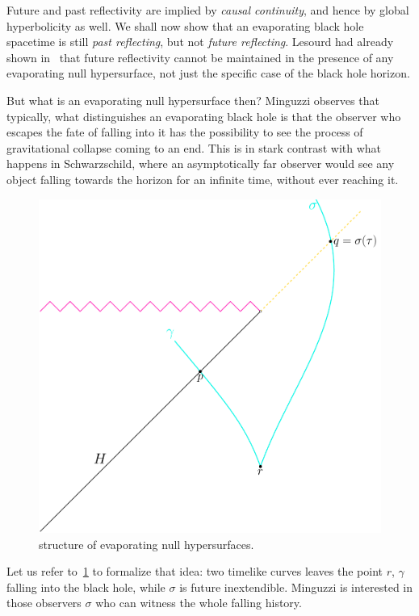 	Future and past reflectivity are implied by \emph{causal continuity}, and hence by global hyperbolicity as well. We shall now show that an evaporating black hole spacetime is still \emph{past reflecting}, but not \emph{future reflecting}. Lesourd had already shown in~\cite[]{lesourd2018causal} that future reflectivity cannot be
	maintained in the presence of any evaporating null hypersurface, not just the specific case of the black hole horizon. 

	But what is an evaporating null hypersurface then? Minguzzi observes that typically, what distinguishes an evaporating black hole is that the observer who escapes the fate of falling into it has the possibility to see the process of gravitational collapse coming to an end. This is in stark contrast with what happens in Schwarzschild, where an asymptotically far observer would see any object falling towards the horizon for an infinite time, without ever reaching it.

	\begin{figure}
		\centering
		\includegraphics[scale=0.5]{Immagini/evaporating-surfaces/evaporating-surfaces.pdf}
		\caption{structure of evaporating null hypersurfaces.}
		\label{fig:evaporating-surface}
	\end{figure}

	Let us refer to~\ref{fig:evaporating-surface} to formalize that idea: two timelike curves leaves the point \(r\), \(\gamma\) falling into the black hole, while \(\sigma\) is future inextendible. Minguzzi is interested in those observers \(\sigma\) who can witness the whole falling history.


